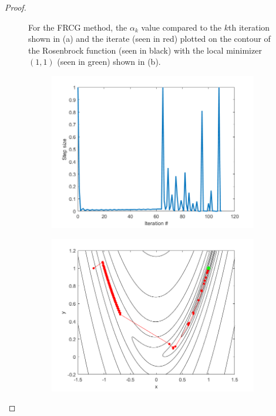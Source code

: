\documentclass[12pt]{report}
\begin{document}
\begin{problem}
\begin{proof}
\begin{figure}[H]
\begin{subfigure}[b]{0.5\linewidth}
            \caption{}
            \label{fig4-4:b}
            \vspace{4ex}
        \end{subfigure}
        \caption{For the FRCG method, the $\alpha_k$ value compared to the $k$th iteration shown in (a) and the iterate (seen in red) plotted on the contour of the Rosenbrock function (seen in black) with the local minimizer $(1,1)$ (seen in green) shown in (b).}
        \label{fig4-4}
    \end{figure}
    \begin{figure}[H]
        \begin{subfigure}[b]{0.5\linewidth}
            \centering
            \includegraphics[width=\linewidth]{images/4-5-alpha.png}
            \caption{}
            \label{fig4-5:a}
            \vspace{4ex}
        \end{subfigure}%
        \begin{subfigure}[b]{0.5\linewidth}
            \centering
            \includegraphics[width=\linewidth]{images/4-5-contour.png}

\end{subfigure}
\end{figure}
\end{proof}
\end{problem}
\end{document}
